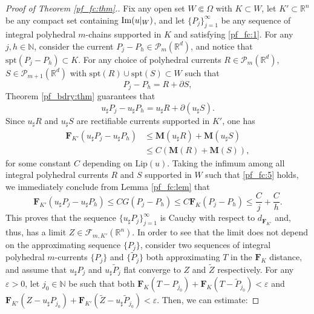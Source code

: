 \documentclass[a4paper,11pt,reqno]{amsart}
\theoremstyle{definition}
\numberwithin{equation}{section}
\numberwithin{subsection}{section}
\newcommand{\N}{\mathbb{N}}
\newcommand{\R}{\mathbb{R}}
\newcommand{\M}{\mathbf{M}}
\newcommand{\Fl}{\mathbf{F}}
\newcommand{\F}{\mathscr{F}}
\newcommand{\Lip}{\mathrm{Lip}}
\newcommand{\spt}{\mathrm{spt}}
\begin{document}
\begin{proof}[Proof of Theorem \ref{pf_fc:thm}.]
Fix any open set $W \Subset \Omega$ with $K \subset W$, let $K' \subset \R^{n}$ be any compact set containing ${\rm Im}(u|_{W})$, and let $\lbrace P_{j} \rbrace_{j=1}^{\infty}$ be any sequence of integral polyhedral $m$-chains supported in $K$ and satisfying \eqref{pf_fc:1}. For any $j, h \in \N$, consider the current $P_{j} - P_{h} \in \mathscr{P}_{m}(\R^{d})$, and notice that $\spt(P_{j} - P_{h}) \subset K$. For any choice of polyhedral currents $R \in \mathscr{P}_{m}(\R^{d})$, $S \in \mathscr{P}_{m+1}(\R^{d})$ with $\spt(R) \cup \spt(S) \subset W$ such that
\begin{equation} \label{pf_fc:5}
P_{j} - P_{h} = R + \partial S,
\end{equation}
Theorem \ref{pf_bdry:thm} guarantees that
\begin{equation} \label{pf_fc:6}
u_{\sharp}P_{j} - u_{\sharp}P_{h} = u_{\sharp}R + \partial(u_{\sharp}S).
\end{equation}
Since $u_{\sharp}R$ and $u_{\sharp}S$ are rectifiable currents supported in $K'$, one has
\begin{equation} \label{pf_fc:7}
\begin{split}
\Fl_{K'}(u_{\sharp}P_{j} - u_{\sharp}P_{h}) &\leq \M(u_{\sharp}R) + \M(u_{\sharp}S) \\
&\leq C \left( \M(R) + \M(S) \right),
\end{split}
\end{equation}
for some constant $C$ depending on $\Lip(u)$. Taking the infimum among all integral polyhedral currents $R$ and $S$ supported in $W$ such that \eqref{pf_fc:5} holds, we immediately conclude from Lemma \ref{pf_fc:lem} that
\begin{equation} \label{pf_fc:8}
\Fl_{K'}(u_{\sharp}P_{j} - u_{\sharp}P_{h}) \leq C G(P_{j} - P_{h}) \leq C \Fl_{K}(P_{j} - P_{h}) \leq \frac{C}{j} + \frac{C}{h}.
\end{equation}
This proves that the sequence $\lbrace u_{\sharp} P_{j} \rbrace_{j=1}^{\infty}$ is Cauchy with respect to $d_{\Fl_{K'}}$ and, thus, has a limit $Z \in \F_{m,K'}(\R^{n})$. In order to see that the limit does not depend on the approximating sequence $\lbrace P_{j} \rbrace$, consider two sequences of integral polyhedral $m$-currents $\lbrace P_{j} \rbrace$ and $\lbrace \tilde{P}_{j} \rbrace$ both approximating $T$ in the $\Fl_{K}$ distance, and assume that $u_{\sharp} P_{j}$ and $u_{\sharp} \tilde{P}_{j}$ flat converge to $Z$ and $\tilde{Z}$ respectively. For any $\varepsilon > 0$, let $j_{0} \in \N$ be such that both $\Fl_{K}(T - P_{j_0}) + \Fl_{K}(T - \tilde{P}_{j_0}) < \varepsilon$ and $\Fl_{K'}(Z - u_{\sharp}P_{j_0}) + \Fl_{K'}(\tilde{Z} - u_{\sharp} \tilde{P}_{j_0}) < \varepsilon$. Then, we can estimate:

\end{proof}
\end{document}

